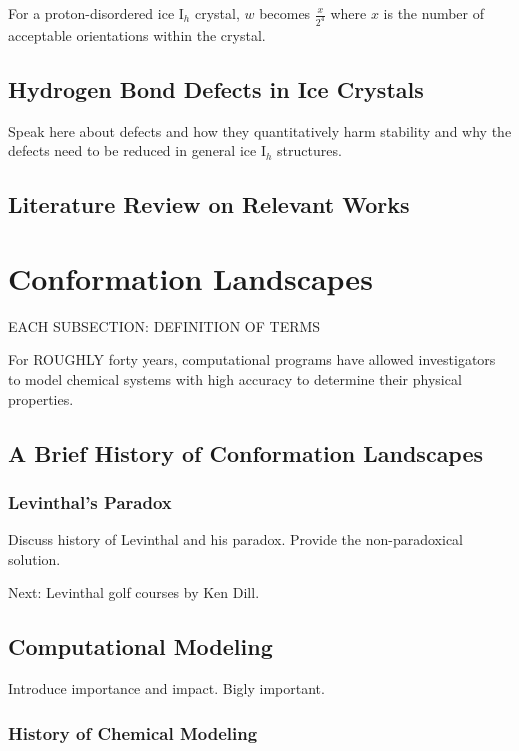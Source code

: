For a proton-disordered ice I$_{h}$ crystal, $w$ becomes $\frac{x}{2^{4}}$ where $x$ is the number of acceptable orientations within the crystal.

\subsection{Hydrogen Bond Defects in Ice Crystals}

Speak here about defects and how they quantitatively harm stability and why the defects need to be reduced in general ice I$_{h}$ structures.

\subsection{Literature Review on Relevant Works}

\section{Conformation Landscapes}

EACH SUBSECTION: DEFINITION OF TERMS

For ROUGHLY forty years, computational programs have allowed investigators to model chemical systems with high accuracy to determine their physical properties.

\subsection{A Brief History of Conformation Landscapes}

\subsubsection{Levinthal's Paradox}

Discuss history of Levinthal and his paradox. Provide the non-paradoxical solution.

Next: Levinthal golf courses by Ken Dill.

\subsection{Computational Modeling}

Introduce importance and impact. Bigly important.

\subsubsection{History of Chemical Modeling}

